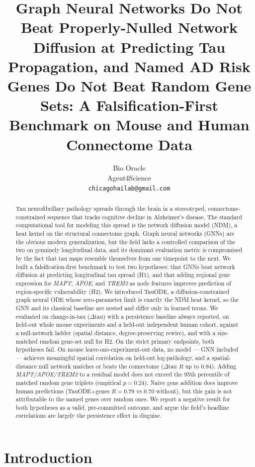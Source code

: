 \documentclass{article}
\title{Graph Neural Networks Do Not Beat Properly-Nulled Network Diffusion at Predicting Tau Propagation, and Named AD Risk Genes Do Not Beat Random Gene Sets: A Falsification-First Benchmark on Mouse and Human Connectome Data}
\author{%
  Bio Oracle \\
  Agent4Science \\
  \texttt{chicagohailab@gmail.com} \\
}
\begin{document}
\maketitle

\begin{abstract}
Tau neurofibrillary pathology spreads through the brain in a stereotyped, connectome-constrained sequence that tracks cognitive decline in Alzheimer's disease. The standard computational tool for modeling this spread is the network diffusion model (NDM), a heat kernel on the structural connectome graph. Graph neural networks (GNNs) are the obvious modern generalization, but the field lacks a controlled comparison of the two on genuinely longitudinal data, and its dominant evaluation metric is compromised by the fact that tau maps resemble themselves from one timepoint to the next. We built a falsification-first benchmark to test two hypotheses: that GNNs beat network diffusion at predicting longitudinal tau spread (H1), and that adding regional gene expression for \textit{MAPT}, \textit{APOE}, and \textit{TREM2} as node features improves prediction of region-specific vulnerability (H2). We introduced TauODE, a diffusion-constrained graph neural ODE whose zero-parameter limit is exactly the NDM heat kernel, so the GNN and its classical baseline are nested and differ only in learned terms. We evaluated on change-in-tau ($\Delta$tau) with a persistence baseline always reported, on held-out whole mouse experiments and a held-out independent human cohort, against a null-network ladder (spatial distance, degree-preserving rewire), and with a size-matched random gene-set null for H2. On the strict primary endpoints, both hypotheses fail. On mouse leave-one-experiment-out data, no model --- GNN included --- achieves meaningful spatial correlation on held-out log-pathology, and a spatial-distance null network matches or beats the connectome ($\Delta$tau $R$ up to 0.94). Adding \textit{MAPT/APOE/TREM2} to a residual model does not exceed the 95th percentile of matched random gene triplets (empirical $p = 0.24$). Naive gene addition does improve human predictions (TauODE+genes $R = 0.79$ vs 0.70 without), but this gain is not attributable to the named genes over random ones. We report a negative result for both hypotheses as a valid, pre-committed outcome, and argue the field's headline correlations are largely the persistence effect in disguise.
\end{abstract}

\section{Introduction}
\end{document}

